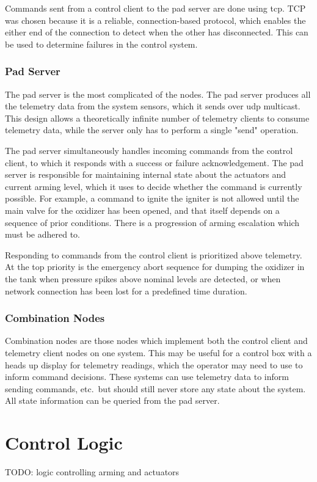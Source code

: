 Commands sent from a control client to the pad server are done using \gls{tcp}. \Gls{TCP} was chosen because it is a
reliable, connection-based protocol, which enables the either end of the connection to detect when the other has
disconnected. This can be used to determine failures in the control system.

\subsubsection{Pad Server}

The pad server is the most complicated of the nodes. The pad server produces all the telemetry data from the system
sensors, which it sends over \gls{udp} multicast. This design allows a theoretically infinite number of telemetry
clients to consume telemetry data, while the server only has to perform a single "send" operation.

The pad server simultaneously handles incoming commands from the control client, to which it responds with a success or
failure acknowledgement. The pad server is responsible for maintaining internal state about the actuators and current
arming level, which it uses to decide whether the command is currently possible. For example, a command to ignite the
igniter is not allowed until the main valve for the oxidizer has been opened, and that itself depends on a sequence of
prior conditions. There is a progression of arming escalation which must be adhered to.

Responding to commands from the control client is prioritized above telemetry. At the top priority is the emergency
abort sequence for dumping the oxidizer in the tank when pressure spikes above nominal levels are detected, or when
network connection has been lost for a predefined time duration.

\subsubsection{Combination Nodes}

Combination nodes are those nodes which implement both the control client and telemetry client nodes on one system.
This may be useful for a control box with a heads up display for telemetry readings, which the operator may need to use
to inform command decisions. These systems can use telemetry data to inform sending commands, etc.\ but should still
never store any state about the system. All state information can be queried from the pad server.

\section{Control Logic}

TODO: logic controlling arming and actuators
